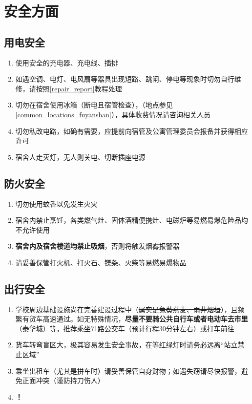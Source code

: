 \chapter[安全方面]{安全方面}

\section[用电安全]{用电安全}
\begin{enumerate}
    \item 使用安全的充电器、充电线、插排
    \item 如遇空调、电灯、电风扇等器具出现短路、跳闸、停电等现象时切勿自行维修，请按照\uline{\ref{repair_report}}教程处理
    \item 切勿在宿舍使用冰箱（断电且宿管检查），\textbf{}（地点参见\uline{\ref{common_locations_fuyanshan}}），具体收费情况请咨询相关人员
    \item 切勿私改电路，如确有需要，应提前向宿管及公寓管理委员会\footnotemark 报备并获得相应许可
    \item 宿舍人走灭灯，无人则关电、切断插座电源
\end{enumerate}

\section[防火安全]{防火安全}
\begin{enumerate}
    \item 切勿使用蚊香以免发生火灾
    \item 宿舍内禁止烹饪，各类燃气灶、固体酒精便携灶、电磁炉等易燃易爆危险品均不允许使用
    \item \textbf{宿舍内及宿舍楼道均禁止吸烟}，否则将触发烟雾报警器
    \item 请妥善保管打火机、打火石、镁条、火柴等易燃易爆物品
\end{enumerate}

\section[出行安全]{出行安全}
\begin{enumerate}
    \item 学校周边基础设施尚在完善建设过程中（\sout{属实是兔葵燕麦、雨井烟垣}），且频繁有货车高速通过。如无特殊情况，\textbf{尽量不要骑公共自行车或者电动车去市里}（泰华城）等，推荐乘坐71路公交车（预计行程30分钟左右）或打车前往
    \item 货车转弯盲区大，极其容易发生安全事故，在等红绿灯时请务必远离“站立禁止区域”
    \item 乘坐出租车（尤其是拼车时）请妥善保管自身财物；如遇失窃请尽快报警，避免正面冲突（谨防持刀伤人）
    \item \textbf{！}
\end{enumerate}

